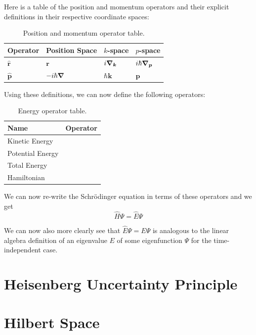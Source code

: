 \documentclass[oneside]{book}
\numberwithin{figure}{section}
\numberwithin{equation}{section}
\newcommand{\dpdv}{\displaystyle\pdv}
\theoremstyle{definition}
\begin{document}
	Here is a table of the position and momentum operators and their explicit definitions in their respective coordinate spaces:
	\begin{table}[H]
		\centering
		\bgroup
		\renewcommand\cellgape{\Gape[5pt]}
		\setlength\extrarowheight{2pt}
		\begin{tabularx}{\textwidth}{YYYY}
			\hline\hline
			Operator & Position Space & $ k $-space & $ p $-space\\
			\hline
			$ \hat{\bm{r}} $ & $ \bm{r} $ & $ i\grad{}_{\bm{k}} $ & $ i\hbar\grad{}_{\bm{p}} $\\
			$ \hat{\bm{p}} $ & $ -i\hbar\grad $ & $ \hbar\bm{k} $ & $ \bm{p} $\\
			\hline\hline
		\end{tabularx}
		\egroup
		\caption{Position and momentum operator table.}
	\end{table}
	Using these definitions, we can now define the following operators:
	\begin{table}[H]
		\centering
		\bgroup
		\renewcommand\cellgape{\Gape[5pt]}
		\setlength\extrarowheight{2pt}
		\begin{tabularx}{\textwidth}{YY}
			\hline\hline
			Name & Operator\\
			\hline\hline
			Kinetic Energy & \\
			Potential Energy & \\
			Total Energy & \makecell[c]{$ \hat{E} = i\hbar\dpdv{t} $}\\
			Hamiltonian & \\
			\hline\hline
		\end{tabularx}
		\egroup
		\caption{Energy operator table.}
	\end{table}
	We can now re-write the Schrödinger equation in terms of these operators and we get
	\begin{equation}
		\hat{H}\Psi = \hat{E}\Psi
	\end{equation}

	We can now also more clearly see that $ \hat{E}\Psi = E\Psi $ is analogous to the linear algebra definition of an eigenvalue $ E $ of some eigenfunction $ \Psi $ for the time-independent case.
	
	\section{Heisenberg Uncertainty Principle}
	\section{Hilbert Space}
\end{document}
